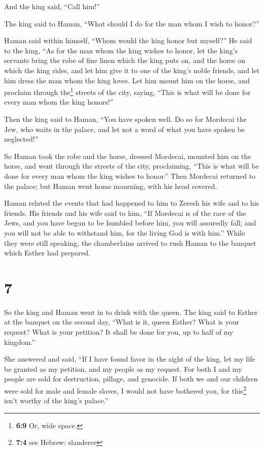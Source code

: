 And the king said, ``Call him!''

 The king said to Haman, ``What should I do for the man
whom I wish to honor?''

Haman said within himself, ``Whom would the king honor but myself?''
 He said to the king, ``As for the man whom the king
wishes to honor,  let the king's servants bring the robe
of fine linen which the king puts on, and the horse on which the king
rides,  and let him give it to one of the king's noble
friends, and let him dress the man whom the king loves. Let him mount
him on the horse, and proclaim through the\footnote{\textbf{6:9} Or,
  wide space.} streets of the city, saying, ``This is what will be done
for every man whom the king honors!''

 Then the king said to Haman, ``You have spoken well. Do
so for Mordecai the Jew, who waits in the palace, and let not a word of
what you have spoken be neglected!''

 So Haman took the robe and the horse, dressed Mordecai,
mounted him on the horse, and went through the streets of the city,
proclaiming, ``This is what will be done for every man whom the king
wishes to honor.''  Then Mordecai returned to the palace;
but Haman went home mourning, with his head covered.

 Haman related the events that had happened to him to
Zeresh his wife and to his friends. His friends and his wife said to
him, ``If Mordecai is of the race of the Jews, and you have begun to be
humbled before him, you will assuredly fall; and you will not be able to
withstand him, for the living God is with him.''  While
they were still speaking, the chamberlains arrived to rush Haman to the
banquet which Esther had prepared.

\hypertarget{section-6}{%
\section{7}\label{section-6}}

 So the king and Haman went in to drink with the queen.
 The king said to Esther at the banquet on the second day,
``What is it, queen Esther? What is your request? What is your petition?
It shall be done for you, up to half of my kingdom.''

 She answered and said, ``If I have found favor in the
sight of the king, let my life be granted as my petition, and my people
as my request.  For both I and my people are sold for
destruction, pillage, and genocide. If both we and our children were
sold for male and female slaves, I would not have bothered you, for
this\footnote{\textbf{7:4} see Hebrew: slanderer} isn't worthy of the
king's palace.''

